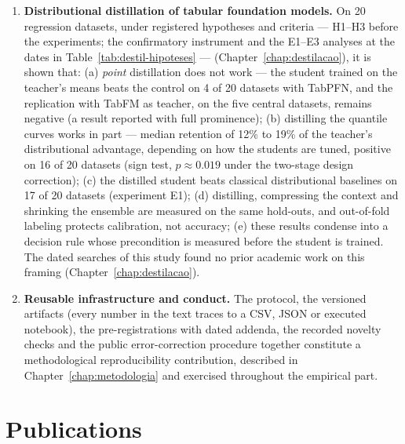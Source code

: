 \begin{enumerate}
    point (shifting 10 to 20\% of the weight from accuracy to
    latency, by median regret under the rank normalization adopted,
    is enough to flip
    the recommendation), quantitatively justifying the flowchart's
    architecture (Chapter~\ref{chap:framework}).
  \item \textbf{Distributional distillation of tabular foundation
    models.} On 20 regression datasets, under registered hypotheses
    and criteria --- H1--H3 before the experiments; the confirmatory
    instrument and the E1--E3 analyses at the dates in
    Table~\ref{tab:destil-hipoteses} ---
    (Chapter~\ref{chap:destilacao}), it is
    shown that: (a) \emph{point} distillation does not work --- the
    student trained on the teacher's means beats the control on 4 of
    20 datasets with TabPFN, and the replication with TabFM as
    teacher, on the five central datasets, remains negative (a
    result reported with full prominence); (b) distilling the
    quantile curves works in part --- median retention of 12\% to
    19\% of the teacher's distributional advantage, depending on how
    the students are tuned, positive on 16 of 20 datasets (sign
    test, $p\approx0.019$ under the two-stage design correction);
    (c) the distilled student beats classical distributional
    baselines on 17 of 20 datasets (experiment E1); (d) distilling,
    compressing the context and shrinking the ensemble are measured
    on the same hold-outs, and out-of-fold labeling protects
    calibration, not accuracy; (e) these results condense into a
    decision rule whose precondition is measured before the student
    is trained. The
    dated searches of this study found no prior academic work on
    this framing (Chapter~\ref{chap:destilacao}).
  \item \textbf{Reusable infrastructure and conduct.} The protocol,
    the versioned artifacts (every number in the text traces to a
    CSV, JSON or executed notebook), the pre-registrations with
    dated addenda, the recorded novelty checks and the public
    error-correction procedure together constitute a methodological
    reproducibility contribution, described in
    Chapter~\ref{chap:metodologia} and exercised throughout the
    empirical part.
\end{enumerate}

\section{Publications}
\label{sec:intro-producao}

